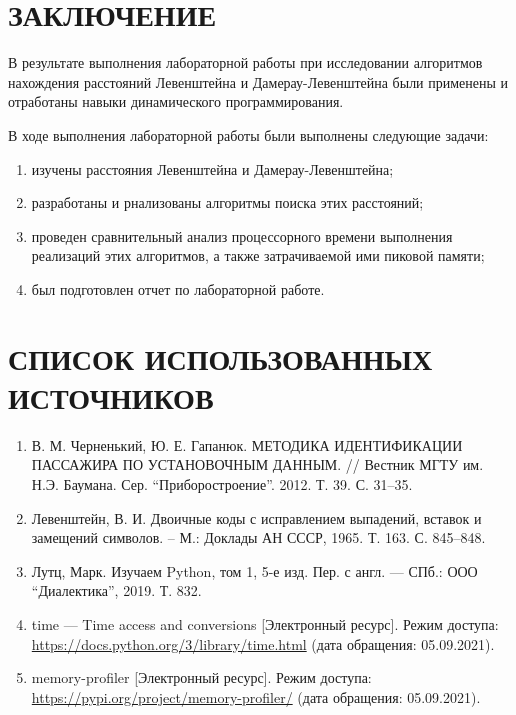 \chapter*{ЗАКЛЮЧЕНИЕ}

В результате выполнения лабораторной работы при исследовании алгоритмов нахождения расстояний Левенштейна и Дамерау-Левенштейна были применены и отработаны навыки динамического программирования.

В ходе выполнения лабораторной работы были выполнены следующие задачи: 
\begin{enumerate}[label={\arabic*)}]
	\item изучены расстояния Левенштейна и Дамерау-Левенштейна;
	\item разработаны и рнализованы алгоритмы поиска этих расстояний;
	\item проведен сравнительный анализ процессорного времени выполнения реализаций этих алгоритмов, а также затрачиваемой ими пиковой памяти;
	\item был подготовлен отчет по лабораторной работе.
\end{enumerate}



\newpage

\chapter*{\large СПИСОК ИСПОЛЬЗОВАННЫХ ИСТОЧНИКОВ} %

\begin{enumerate}
    \item В. М. Черненький, Ю. Е. Гапанюк. МЕТОДИКА ИДЕНТИФИКАЦИИ ПАССАЖИРА ПО УСТАНОВОЧНЫМ ДАННЫМ. // Вестник МГТУ им. Н.Э. Баумана. Сер. “Приборостроение”. 2012. Т. 39. С. 31–35.
    
    \item Левенштейн, В. И. Двоичные коды с исправлением выпадений, вставок и замещений символов. – М.: Доклады АН СССР, 1965. Т. 163. С. 845–848.
    
    \item Лутц, Марк. Изучаем Python, том 1, 5-е изд. Пер. с англ. — СПб.: ООО “Диалектика”, 2019. Т. 832.
    
    \item time — Time access and conversions [Электронный ресурс]. Режим доступа: \url{https://docs.python.org/3/library/time.html} (дата обращения: 05.09.2021).
    
    \item memory-profiler [Электронный ресурс]. Режим доступа: \url{https://pypi.org/project/memory-profiler/} (дата обращения: 05.09.2021).
\end{enumerate}



